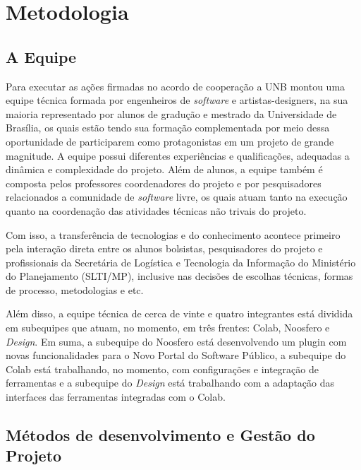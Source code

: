 \section{Metodologia}
\label{sec:metodologia}

\subsection{A Equipe}
\label{sec:equipe}
Para executar as ações firmadas no acordo de cooperação a UNB montou uma equipe técnica formada por engenheiros de \textit{software} e artistas-designers, na sua maioria representado por alunos de gradução e mestrado da Universidade de Brasília, os quais estão tendo sua formação complementada por meio dessa oportunidade de participarem como protagonistas em um projeto de grande magnitude.
A equipe possui diferentes experiências e qualificações, adequadas a dinâmica e complexidade do projeto. Além de alunos, a equipe também é composta pelos professores coordenadores do projeto e por pesquisadores relacionados a comunidade de \textit{software} livre, os quais atuam tanto na execução quanto na coordenação das 
atividades técnicas não trivais do projeto.

Com isso, a transferência de tecnologias e do conhecimento acontece primeiro pela interação direta entre
os alunos bolsistas, pesquisadores do projeto e profissionais da Secretária de Logística e Tecnologia da Informação do Ministério do Planejamento (SLTI/MP), inclusive nas decisões de escolhas
técnicas, formas de processo, metodologias e etc. 

Além disso, a equipe técnica de cerca de vinte e quatro integrantes está dividida em subequipes que atuam, no momento, em três frentes: Colab, Noosfero e \textit{Design}. Em suma, a subequipe do Noosfero está desenvolvendo um plugin com novas funcionalidades para o Novo Portal do Software Público, a subequipe do Colab está trabalhando, no momento, com configurações e integração de ferramentas e a 
subequipe do \textit{Design} está trabalhando com a adaptação das interfaces das ferramentas integradas com o Colab.


\subsection{Métodos de desenvolvimento e Gestão do Projeto}
\label{sec:metodo-gestao}

